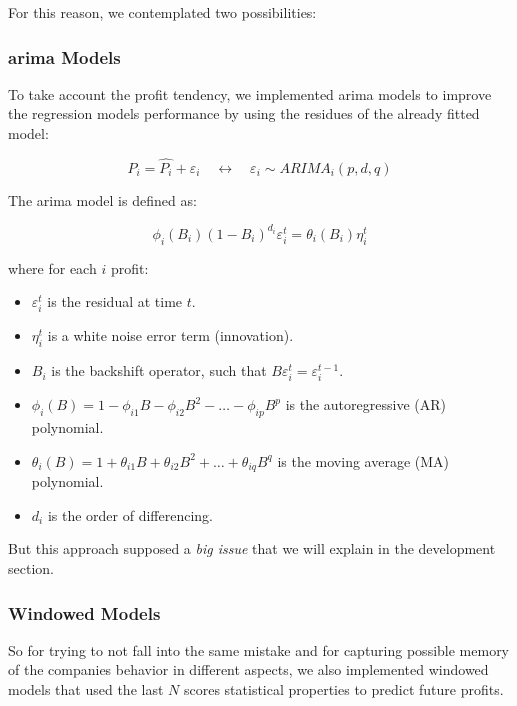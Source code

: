 \documentclass[11pt,english,a4paper,hidelinks]{book}
\begin{document}
\vspace{0.5cm}
\noindent For this reason, we contemplated two possibilities:

\subsubsection{\Acrshort{arima} Models}
To take account the profit tendency, we implemented \acrshort{arima} models to improve the regression models performance by using the residues of the already fitted model:

\begin{equation}
    P_i = \hat{P_i} + {\varepsilon_i} \quad \longleftrightarrow \quad {\varepsilon_i} \sim ARIMA_i(p,d,q)
\end{equation}

\noindent The \acrshort{arima} model is defined as:

\begin{equation}
    \phi_i(B_i){(1 - B_i)}^{d_i} \varepsilon_i^t = \theta_i(B_i) \eta_i^t
    \end{equation}
    
    \noindent where for each \(i\) profit:
    \begin{itemize}
      \item \(\varepsilon_i^t\) is the residual at time \(t\).
      \item \(\eta_i^t\) is a white noise error term (innovation).
      \item \(B_i\) is the backshift operator, such that \(B \varepsilon_i^t = \varepsilon_i^{t-1}\).
      \item \(\phi_i(B) = 1 - \phi_{i1} B - \phi_{i2} B^2 - \dots - \phi_{ip} B^p\) is the autoregressive (AR) polynomial.
      \item \(\theta_i(B) = 1 + \theta_{i1} B + \theta_{i2} B^2 + \dots + \theta_{iq} B^q\) is the moving average (MA) polynomial.
      \item \(d_i\) is the order of differencing.
    \end{itemize}
    
\noindent But this approach supposed a \textit{big issue} that we will explain in the development section.

\subsubsection{Windowed Models}
So for trying to not fall into the same mistake and for capturing possible memory of the companies behavior in different aspects, we also implemented windowed models that used the last \(N\) scores statistical properties to predict future profits.
\end{document}
